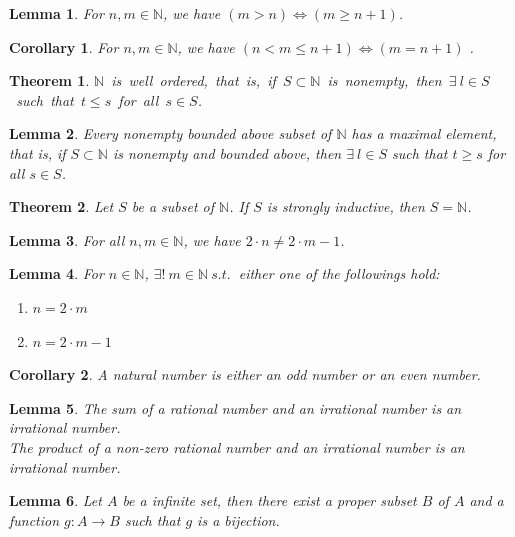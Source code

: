 \documentclass[11pt]{article}
\theoremstyle{break}
\theoremstyle{break}
\newtheorem{thm}{Theorem}[section]
\newtheorem{lem}{Lemma}[thm]
\newtheorem{corL}{Corollary}[lem]
\newcommand{\N}{\mathbb{N}}
\begin{document}
	\begin{lem}
		For $n,m \in \N$, we have $(m>n) \iff (m \geq n+1)$.
	\end{lem}
	
	\begin{corL}
		For $n,m \in \N$, we have $(n<m \leq n+1) \iff (m = n+1)$ .
	\end{corL}
	
	\begin{thm}
		\mbox{$\N$ is well ordered, that is, if $S \subset \N$ is nonempty, then $\exists \ l \in S$ such that $t \leq s$ for all $s \in S$.}
	\end{thm}
	
	\begin{lem}
		Every nonempty bounded above subset of $\N$ has a maximal element, that is, if $S \subset \N$ is nonempty and bounded above, then $\exists \ l \in S$ such that $t \geq s$ for all $s \in S$.
	\end{lem}
	
	\begin{thm}
		Let $S$ be a subset of $\N$. If $S$ is strongly inductive, then $S=\N$.
	\end{thm}
	
	\begin{lem}
		For all $n,m \in \N$, we have $2 \cdot n \neq 2 \cdot m -1$.
	\end{lem}
	
	\begin{lem}
		For $n \in \N$, $\exists! \ m \in \N \ s.t. \ $ either one of the followings hold:
		\begin{enumerate}[topsep=3pt,itemsep=-1ex,partopsep=1ex,parsep=1ex]
			\item $n =2 \cdot m$
			\item $n =2 \cdot m -1$
		\end{enumerate}
	\end{lem}
	
	\begin{corL}
		A natural number is either an odd number or an even number.
	\end{corL}

	\begin{lem}	
		The sum of a rational number and an irrational number is an irrational number.\\ The product of a non-zero rational number and an irrational number is an irrational number.
	\end{lem}
		
	\begin{lem}
		Let $A$ be a infinite set, then there exist a proper subset $B$ of $A$ and a function $g:A \to B$ such that $g$ is a bijection.
	\end{lem}
	
\end{document}
